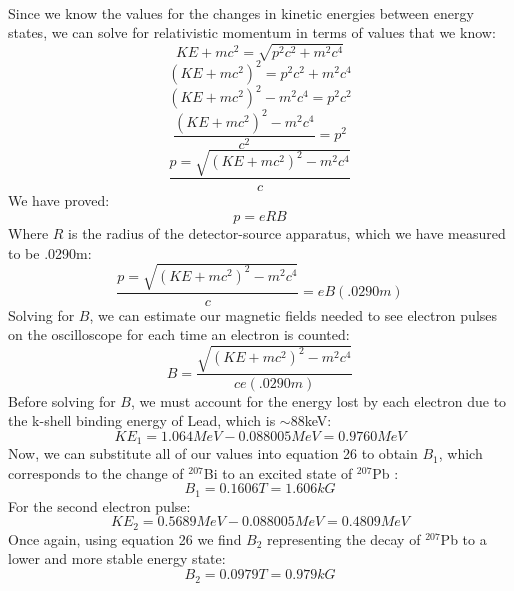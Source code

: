 \\
Since we know the values for the changes in kinetic energies between energy states, we can solve for relativistic momentum in terms of values that we know:
\begin{equation}KE+mc^2=\sqrt{p^2c^2+m^2c^4}\end{equation}
\begin{equation}(KE+mc^2)^2=p^2c^2+m^2c^4\end{equation}
\begin{equation}(KE+mc^2)^2-m^2c^4=p^2c^2\end{equation}
\begin{equation}\frac{(KE+mc^2)^2-m^2c^4}{c^2}=p^2\end{equation}
\begin{equation}\frac{p=\sqrt{(KE+mc^2)^2-m^2c^4}}{c}\end{equation}
We have proved:
\begin{equation}p=eRB\end{equation}
Where $R$ is the radius of the detector-source apparatus, which we have measured to be .0290m:
\begin{equation}\frac{p=\sqrt{(KE+mc^2)^2-m^2c^4}}{c}=eB(.0290m)\end{equation}
Solving for $B$, we can estimate our magnetic fields needed to see electron pulses on the oscilloscope for each time an electron is counted:
\begin{equation}B=\frac{\sqrt{(KE+mc^2)^2-m^2c^4}}{ce(.0290m)}\end{equation}
Before solving for $B$, we must account for the energy lost by each electron due to the k-shell binding energy of Lead, which is $\sim$88keV:
\begin{equation}KE_1=1.064MeV-0.088005MeV=0.9760 MeV\end{equation}
Now, we can substitute all of our values into equation 26 to obtain $B_1$, which corresponds to the change of $^{207}$Bi to an excited state of $^{207}$Pb :
\begin{equation} B_1=0.1606T=1.606kG\end{equation}
For the second electron pulse:
\begin{equation}KE_2=0.5689MeV-0.088005MeV=0.4809MeV\end{equation}
Once again, using equation 26 we find $B_2$ representing the decay of $^{207}$Pb to a lower and more stable energy state:
\begin{equation}B_2=0.0979T=0.979kG\end{equation}

